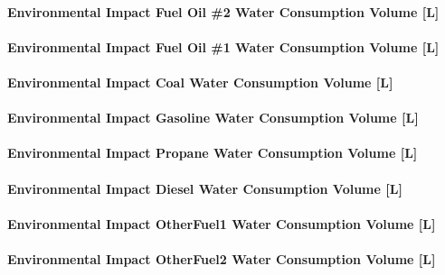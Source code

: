 \paragraph{Environmental Impact Fuel Oil \#2 Water Consumption Volume {[}L{]}}\label{environmental-impact-fuel-oil-2-water-consumption-volume-l}

\paragraph{Environmental Impact Fuel Oil \#1 Water Consumption Volume {[}L{]}}\label{environmental-impact-fuel-oil-1-water-consumption-volume-l}

\paragraph{Environmental Impact Coal Water Consumption Volume {[}L{]}}\label{environmental-impact-coal-water-consumption-volume-l}

\paragraph{Environmental Impact Gasoline Water Consumption Volume {[}L{]}}\label{environmental-impact-gasoline-water-consumption-volume-l}

\paragraph{Environmental Impact Propane Water Consumption Volume {[}L{]}}\label{environmental-impact-propane-water-consumption-volume-l}

\paragraph{Environmental Impact Diesel Water Consumption Volume {[}L{]}}\label{environmental-impact-diesel-water-consumption-volume-l}

\paragraph{Environmental Impact OtherFuel1 Water Consumption Volume {[}L{]}}\label{environmental-impact-otherfuel1-water-consumption-volume-l}

\paragraph{Environmental Impact OtherFuel2 Water Consumption Volume {[}L{]}}\label{environmental-impact-otherfuel2-water-consumption-volume-l}

